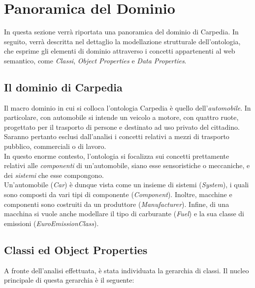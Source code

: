 \chapter{Panoramica del Dominio}
In questa sezione verrà riportata una panoramica del dominio di Carpedia. In seguito, verrà descritta nel dettaglio la modellazione strutturale dell'ontologia, che esprime gli elementi di dominio attraverso i concetti
appartenenti al web semantico, come \textit{Classi}, \textit{Object Properties} e \textit{Data Properties}.

\section{Il dominio di Carpedia}
Il macro dominio in cui si colloca l'ontologia Carpedia è quello dell'\textit{automobile}. In particolare, con automobile si intende un veicolo a motore, con quattro ruote, progettato per il trasporto di persone
e destinato ad uso privato del cittadino. Saranno pertanto esclusi dall'analisi i concetti relativi a mezzi di trasporto pubblico, commerciali o di lavoro.\\

In questo enorme contesto, l'ontologia si focalizza sui concetti prettamente relativi alle \textit{componenti} di un'automobile, siano esse sensoristiche o meccaniche, e dei \textit{sistemi} che
esse compongono.\\

Un'automobile (\textit{Car}) è dunque vista come un insieme di sistemi (\textit{System}), i quali sono composti da vari tipi di componente (\textit{Component}).
Inoltre, macchine e componenti sono costruiti da un produttore (\textit{Manufacturer}). Infine, di una macchina si vuole anche modellare il tipo di carburante (\textit{Fuel}) e la sua classe di emissioni (\textit{EuroEmissionClass}).\\

\section{Classi ed Object Properties}
A fronte dell'analisi effettuata, è stata individuata la gerarchia di classi. Il nucleo principale di questa gerarchia è il seguente:


